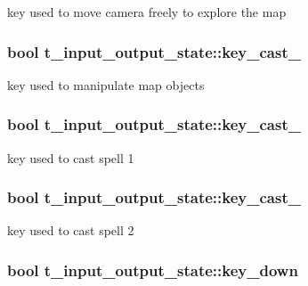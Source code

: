 key used to move camera freely to explore the map \hypertarget{structt__input__output__state_a58c75f9aee14025fc22d16100a7b638b}{
\subsubsection[{key\-\_\-cast\-\_\-1}]{\setlength{\rightskip}{0pt plus 5cm}bool t\-\_\-input\-\_\-output\-\_\-state\-::key\-\_\-cast\-\_}}\label{structt__input__output__state_a58c75f9aee14025fc22d16100a7b638b}
key used to manipulate map objects \hypertarget{structt__input__output__state_a84a4ec4b57148499b1ab2f25842fdac5}{
\subsubsection[{key\-\_\-cast\-\_\-2}]{\setlength{\rightskip}{0pt plus 5cm}bool t\-\_\-input\-\_\-output\-\_\-state\-::key\-\_\-cast\-\_}}\label{structt__input__output__state_a84a4ec4b57148499b1ab2f25842fdac5}
key used to cast spell 1 \hypertarget{structt__input__output__state_a82487c01eb24e2339682b0b0c7f0edab}{
\subsubsection[{key\-\_\-cast\-\_\-3}]{\setlength{\rightskip}{0pt plus 5cm}bool t\-\_\-input\-\_\-output\-\_\-state\-::key\-\_\-cast\-\_}}\label{structt__input__output__state_a82487c01eb24e2339682b0b0c7f0edab}
key used to cast spell 2 \hypertarget{structt__input__output__state_aff3f4f05784c0a89291a2ac094f0a460}{
\subsubsection[{key\-\_\-down}]{\setlength{\rightskip}{0pt plus 5cm}bool t\-\_\-input\-\_\-output\-\_\-state\-::key\-\_\-down}}\label{structt__input__output__state_aff3f4f05784c0a89291a2ac094f0a460}
